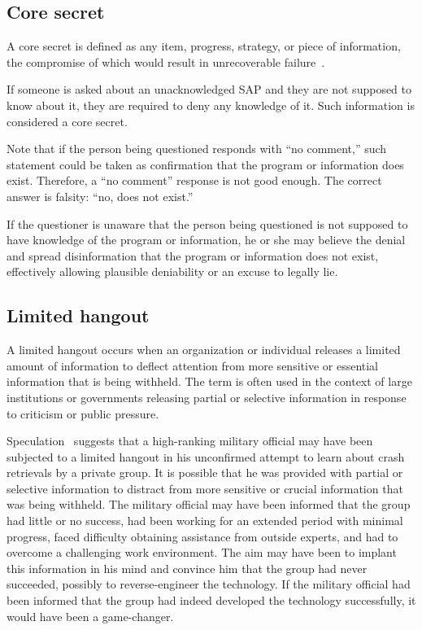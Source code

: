 \subsection{Core secret}

A core secret is defined as any item, progress, strategy, or piece of information, the compromise of which would result in unrecoverable failure~\cite{Sweetman2000}.

If someone is asked about an unacknowledged SAP and they are not supposed to know about it, they are required to deny any knowledge of it. Such information is considered a core secret.

Note that if the person being questioned responds with ``no comment,''
such statement could be taken as confirmation that the program or information does exist.
Therefore, a ``no comment'' response is not good enough.
The correct answer is falsity: ``no, does not exist.''

If the questioner is unaware that the person being questioned is not supposed to have knowledge of the program or information, he or she may believe the denial and spread disinformation that the program or information does not exist, effectively allowing plausible deniability or an excuse to legally lie.

\subsection{Limited hangout}

A limited hangout occurs when an organization or individual releases a limited amount of information to deflect attention from more sensitive or essential information that is being withheld. The term is often used in the context of large institutions or governments releasing partial or selective information in response to criticism or public pressure.

Speculation~\cite{Dolan-MrX-Disclosure2020Jul} suggests that a high-ranking military official may have been subjected to a limited hangout in his unconfirmed attempt to learn about crash retrievals by a private group. It is possible that he was provided with partial or selective information to distract from more sensitive or crucial information that was being withheld. The military official may have been informed that the group had little or no success, had been working for an extended period with minimal progress, faced difficulty obtaining assistance from outside experts, and had to overcome a challenging work environment. The aim may have been to implant this information in his mind and convince him that the group had never succeeded, possibly to reverse-engineer the technology. If the military official had been informed that the group had indeed developed the technology successfully, it would have been a game-changer.


